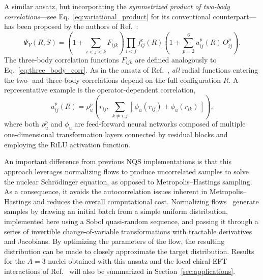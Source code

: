 A similar ansatz, but incorporating the \emph{symmetrized product of two-body correlations}---see Eq.~\eqref{eq:variational_product} for its conventional counterpart---has been proposed by the authors of Ref.~\cite{wen_neural-network_2025}:
\begin{equation}
\Psi_V(R,S) =
\left( 1 + \sum_{i<j<k} F_{ijk} \right)
\prod_{i<j} f^c_{ij}(R)
\left( 1 + \sum_{p=2}^6 u_{ij}^p(R)\, O_{ij}^p \right).
\label{eq:wen_ansatz}
\end{equation}
The three-body correlation functions $F_{ijk}$ are defined analogously to
Eq.~\eqref{eq:three_body_corr}. As in the ansatz of Ref.~\cite{wen_neural-network_2025},
\emph{all} radial functions entering the two- and three-body correlations depend on the full
configuration $R$. A representative example is the operator-dependent correlation,
\begin{equation}
u_{ij}^p(R) =
\rho_u^p\!\left(
r_{ij},\,
\sum_{k\neq i,j}
\left[\, \phi_u(r_{ij}) + \phi_u(r_{ik}) \,\right]
\right),
\label{eq:wen_u_corr}
\end{equation}
where both $\rho_u^p$ and $\phi_u$ are feed-forward neural networks composed of multiple one-dimensional transformation layers connected by residual blocks and employing the RiLU activation function.

An important difference from previous NQS implementations is that this approach leverages normalizing flows to produce uncorrelated samples to solve the nuclear Schr\"odinger equation, as opposed to Metropolis–Hastings sampling. As a consequence, it avoids the autocorrelation issues inherent in Metropolis–Hastings and reduces the overall computational cost.
Normalizing flows~\cite{albergo_flow-based_2019,brady_normalizing_2021,wen_application_2024} generate samples by drawing an initial batch from a simple uniform distribution, implemented here using a Sobol quasi-random sequence, and passing it through a series of invertible change-of-variable transformations with tractable derivatives and Jacobians. By optimizing the parameters of the flow, the resulting distribution can be made to closely approximate the target distribution.
Results for the $A=3$ nuclei obtained with this ansatz and the local chiral-EFT interactions of Ref.~\cite{gezerlis_local_2014} will also be summarized in Section~\ref{sec:applications}.


